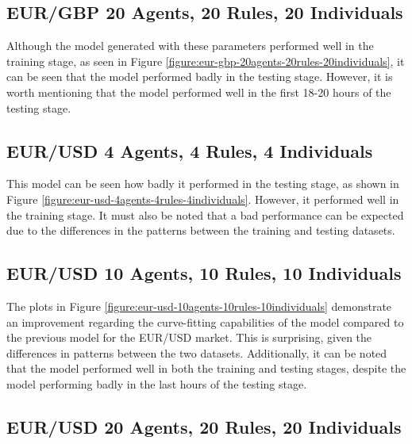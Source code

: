 \newpage

\subsection{EUR/GBP 20 Agents, 20 Rules, 20 Individuals}
\label{results:forecast-eur-gbp-20agents-20rules-20individuals}

Although the model generated with these parameters performed well in the
training stage, as seen in Figure
\ref{figure:eur-gbp-20agents-20rules-20individuals}, it can be seen that the
model performed badly in the testing stage. However, it is worth mentioning that
the model performed well in the first 18-20 hours of the testing stage.






\newpage

\subsection{EUR/USD 4 Agents, 4 Rules, 4 Individuals}
\label{results:forecast-eur-usd-4agents-4rules-4individuals}

This model can be seen how badly it performed in the testing stage, as shown in
Figure \ref{figure:eur-usd-4agents-4rules-4individuals}. However, it performed
well in the training stage. It must also be noted that a bad performance can be
expected due to the differences in the patterns between the training and testing
datasets.



\newpage

\subsection{EUR/USD 10 Agents, 10 Rules, 10 Individuals}
\label{results:forecast-eur-usd-10agents-10rules-10individuals}

The plots in Figure \ref{figure:eur-usd-10agents-10rules-10individuals}
demonstrate an improvement regarding the curve-fitting capabilities of the model
compared to the previous model for the EUR/USD market. This is surprising, given
the differences in patterns between the two datasets. Additionally, it can be
noted that the model performed well in both the training and testing stages,
despite the model performing badly in the last hours of the testing stage.



\newpage

\subsection{EUR/USD 20 Agents, 20 Rules, 20 Individuals}
\label{results:forecast-eur-usd-20agents-20rules-20individuals}


